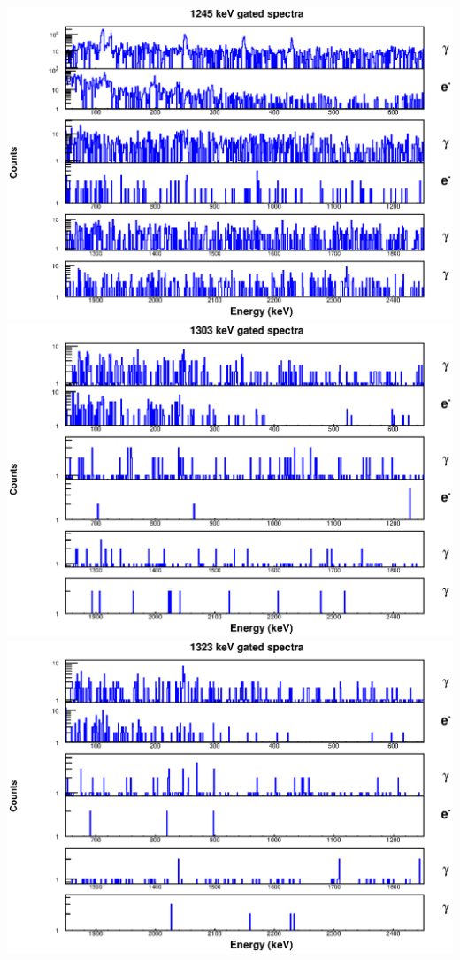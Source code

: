 \includegraphics[scale=0.8]{154Gd_Appendix/1245_combined.eps}
\includegraphics[scale=0.8]{154Gd_Appendix/1303_combined.eps}
\includegraphics[scale=0.8]{154Gd_Appendix/1323_combined.eps}
